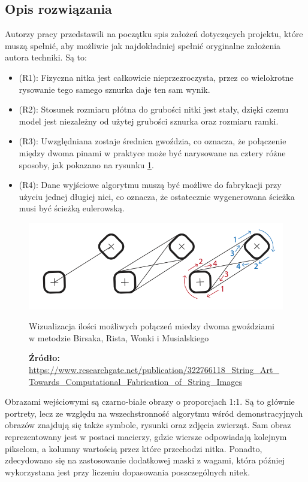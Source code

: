 \documentclass[a4paper, 12pt, polish, twoside]{extreport}
\begin{document}
        \subsection{Opis rozwiązania}
        Autorzy pracy przedstawili na początku spis założeń dotyczących projektu, które muszą spełnić, aby możliwie jak najdokładniej spełnić oryginalne założenia autora techniki. Są to:
        \begin{itemize}
            \item (R1): Fizyczna nitka jest całkowicie nieprzezroczysta, przez co wielokrotne rysowanie tego samego sznurka daje ten sam wynik.
            \item (R2): Stosunek rozmiaru płótna do grubości nitki jest stały, dzięki czemu model jest niezależny od użytej grubości sznurka oraz rozmiaru ramki. 
            \item (R3): Uwzględniana zostaje średnica gwoździa, co oznacza, że połączenie między dwoma pinami w praktyce może być narysowane na cztery różne sposoby, jak pokazano na rysunku \ref{birsak-edges}.
            \item (R4): Dane wyjściowe algorytmu muszą być możliwe do fabrykacji przy użyciu jednej długiej nici, co oznacza, że ostatecznie wygenerowana ścieżka musi być ścieżką eulerowską. 
        \end{itemize}
        \begin{figure}[H]
            \centering
            \includegraphics[width=\textwidth,keepaspectratio]{img/3-others/birsak-edges.png}
            \caption{Wizualizacja ilości możliwych połączeń miedzy dwoma gwoździami w metodzie Birsaka, Rista, Wonki i Musialskiego}
            \caption*{\footnotesize{\textbf{Źródło:} {\url{https://www.researchgate.net/publication/322766118_String_Art_Towards_Computational_Fabrication_of_String_Images}}}}
            \label{birsak-edges}
        \end{figure}
    
        Obrazami wejściowymi są czarno-białe obrazy o proporcjach 1:1. Są to głównie portrety, lecz ze względu na wszechstronność algorytmu wśród demonstracyjnych obrazów znajdują się także symbole, rysunki oraz zdjęcia zwierząt. Sam obraz reprezentowany jest w postaci macierzy, gdzie wiersze odpowiadają kolejnym pikselom, a kolumny wartością przez które przechodzi nitka. Ponadto, zdecydowano się na zastosowanie dodatkowej maski z wagami, która później wykorzystana jest przy liczeniu dopasowania poszczególnych nitek.
        
\end{document}
